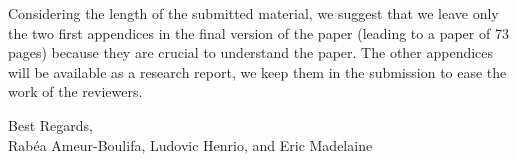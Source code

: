 \documentclass[10pt]{article}
\begin{document}
\smallskip

Considering the length of the submitted material, we suggest that we
leave only the two first appendices in the final version of the paper (leading to a
paper of 73 pages) because they are crucial to understand the paper.
The other appendices will be available as a research report, we keep
them in the submission to ease the work of the reviewers. %

\begin{flushright}
  Best Regards,\\
  Rab\'ea Ameur-Boulifa, Ludovic Henrio, and Eric Madelaine
\end{flushright}
\end{document}
